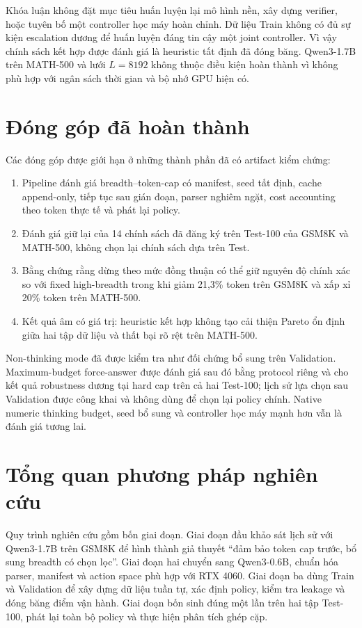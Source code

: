Khóa luận không đặt mục tiêu huấn luyện lại mô hình nền, xây dựng verifier, hoặc
tuyên bố một controller học máy hoàn chỉnh. Dữ liệu Train không có đủ sự kiện
escalation dương để huấn luyện đáng tin cậy một joint controller. Vì vậy chính
sách kết hợp được đánh giá là heuristic tất định đã đóng băng. Qwen3-1.7B trên
MATH-500 và lưới $L=8192$ không thuộc điều kiện hoàn thành vì không phù hợp với
ngân sách thời gian và bộ nhớ GPU hiện có.

\section{Đóng góp đã hoàn thành}

Các đóng góp được giới hạn ở những thành phần đã có artifact kiểm chứng:

\begin{enumerate}
  \item Pipeline đánh giá breadth--token-cap có manifest, seed tất định, cache
  append-only, tiếp tục sau gián đoạn, parser nghiêm ngặt, cost accounting theo
  token thực tế và phát lại policy.
  \item Đánh giá giữ lại của 14 chính sách đã đăng ký trên Test-100 của GSM8K
  và MATH-500, không chọn lại chính sách dựa trên Test.
  \item Bằng chứng rằng dừng theo mức đồng thuận có thể giữ nguyên độ chính xác
  so với fixed high-breadth trong khi giảm 21,3\% token trên GSM8K và xấp xỉ
  20\% token trên MATH-500.
  \item Kết quả âm có giá trị: heuristic kết hợp không tạo cải thiện Pareto ổn
  định giữa hai tập dữ liệu và thất bại rõ rệt trên MATH-500.
\end{enumerate}

Non-thinking mode đã được kiểm tra như đối chứng bổ sung trên Validation.
Maximum-budget force-answer được đánh giá sau đó bằng protocol riêng và cho
kết quả robustness dương tại hard cap trên cả hai Test-100; lịch sử lựa chọn
sau Validation được công khai và không dùng để chọn lại policy chính. Native
numeric thinking budget, seed bổ sung và controller học máy mạnh hơn vẫn là
đánh giá tương lai.

\section{Tổng quan phương pháp nghiên cứu}

Quy trình nghiên cứu gồm bốn giai đoạn. Giai đoạn đầu khảo sát lịch sử với
Qwen3-1.7B trên GSM8K để hình thành giả thuyết ``đảm bảo token cap trước, bổ sung
breadth có chọn lọc''. Giai đoạn hai chuyển sang Qwen3-0.6B, chuẩn hóa parser,
manifest và action space phù hợp với RTX 4060. Giai đoạn ba dùng Train và
Validation để xây dựng dữ liệu tuần tự, xác định policy, kiểm tra leakage và
đóng băng điểm vận hành. Giai đoạn bốn sinh đúng một lần trên hai tập Test-100,
phát lại toàn bộ policy và thực hiện phân tích ghép cặp.

